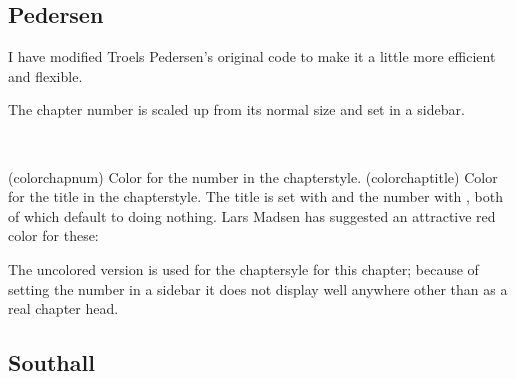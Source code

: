 \subsection{Pedersen}

    I have modified Troels Pedersen's original code to make it a little more
efficient and flexible. 

\begin{lcode}
\newcommand*{\colorchapnum}{}
\newcommand*{\colorchaptitle}{}
\makechapterstyle{pedersen}{%
  \setlength{\beforechapskip}{-20pt}
  \setlength{\afterchapskip}{10pt}
  \renewcommand*{\chapnamefont}{\normalfont\LARGE\itshape}
  \renewcommand*{\chapnumfont}{\normalfont\HUGE\itshape\colorchapnum}
  \renewcommand*{\chaptitlefont}{\normalfont\huge\itshape\colorchaptitle}
  \renewcommand*{\afterchapternum}{}
  \renewcommand*{\printchaptername}{}
  \setlength{\midchapskip}{20mm}
  \renewcommand*{\chapternamenum}{}
  \renewcommand*{\printchapternum}{%
    \sidebar{\raisebox{0pt}[0pt][0pt]{\makebox[0pt][l]{%
      \resizebox{!}{\midchapskip}{\chapnumfont\thechapter}}}}}
  \renewcommand*{\printchaptertitle}[1]{\chaptitlefont ##1}
}
\end{lcode}
The chapter number is scaled up from its normal size and set in a 
sidebar.

\begin{syntax}
  \\
\end{syntax}
\glossary(colorchapnum)
  {}%
  {Color for the number in the  chapterstyle.}
\glossary(colorchaptitle)
  {}%
  {Color for the title in the  chapterstyle.}
  The title is set with  and the number with
, both of which default to doing nothing. 
Lars Madsen
has suggested an attractive red color for these:
\begin{lcode}
\usepackage{color}
\renewcommand{\colorchapnum}{\color{ared}}
\renewcommand{\colorchaptitle}{\color{ared}}
\end{lcode}

    The uncolored version is used for the chaptersyle for this chapter;
because of setting the number in a sidebar it does not
display well anywhere other than as a real chapter head.

\subsection{Southall}

